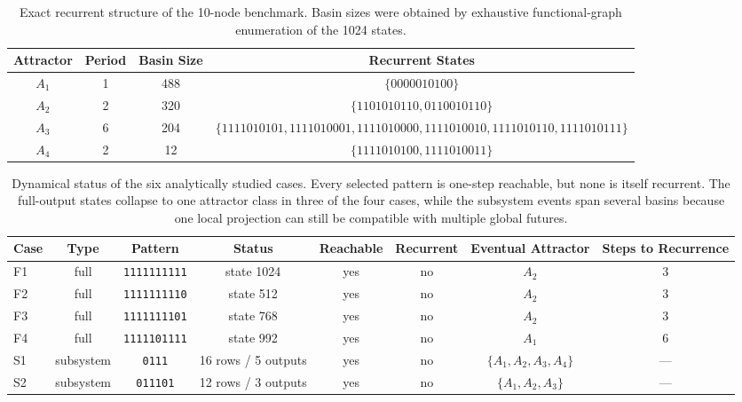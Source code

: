 \documentclass[11pt]{article}
\theoremstyle{definition}
\begin{document}
\begin{table}[t]
\centering
\setlength{\tabcolsep}{5pt}
\scriptsize
\begin{adjustbox}{max width=\textwidth,center}
\begin{tabular}{@{}cccc@{}}
\toprule
Attractor & Period & Basin Size & Recurrent States \\
\midrule
\(A_1\) & 1 & 488 & \(\{0000010100\}\) \\
\(A_2\) & 2 & 320 & \(\{1101010110,0110010110\}\) \\
\(A_3\) & 6 & 204 & \(\{1111010101,1111010001,1111010000,1111010010,1111010110,1111010111\}\) \\
\(A_4\) & 2 & 12 & \(\{1111010100,1111010011\}\) \\
\bottomrule
\end{tabular}
\end{adjustbox}
\caption{Exact recurrent structure of the 10-node benchmark. Basin sizes were obtained by exhaustive functional-graph enumeration of the 1024 states.}
\label{tab:mixed10-attractor-summary}
\end{table}

\begin{table}[t]
\centering
\setlength{\tabcolsep}{4pt}
\scriptsize
\begin{adjustbox}{max width=\textwidth,center}
\begin{tabular}{@{}lccccccc@{}}
\toprule
Case & Type & Pattern & Status & Reachable & Recurrent & Eventual Attractor & Steps to Recurrence \\
\midrule
F1 & full & \texttt{1111111111} & state 1024 & yes & no & \(A_2\) & 3 \\
F2 & full & \texttt{1111111110} & state 512 & yes & no & \(A_2\) & 3 \\
F3 & full & \texttt{1111111101} & state 768 & yes & no & \(A_2\) & 3 \\
F4 & full & \texttt{1111101111} & state 992 & yes & no & \(A_1\) & 6 \\
S1 & subsystem & \texttt{0111} & 16 rows / 5 outputs & yes & no & \(\{A_1,A_2,A_3,A_4\}\) & --- \\
S2 & subsystem & \texttt{011101} & 12 rows / 3 outputs & yes & no & \(\{A_1,A_2,A_3\}\) & --- \\
\bottomrule
\end{tabular}
\end{adjustbox}
\caption{Dynamical status of the six analytically studied cases. Every selected pattern is one-step reachable, but none is itself recurrent. The full-output states collapse to one attractor class in three of the four cases, while the subsystem events span several basins because one local projection can still be compatible with multiple global futures.}
\label{tab:mixed10-dynamics-cases}
\end{table}
\end{document}

